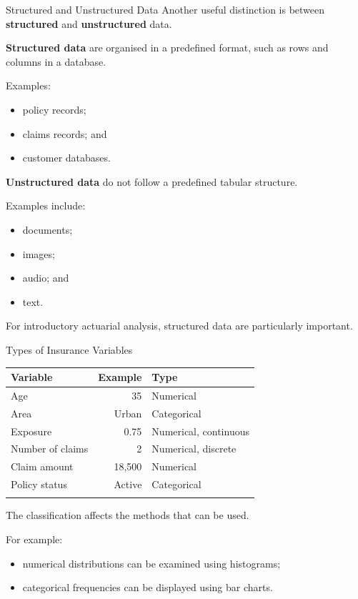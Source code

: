 \documentclass[
  ignorenonframetext,
  aspectratio=169,
]{beamer}
\newcounter{none} %
\providecommand{\tightlist}{%
  \setlength{\itemsep}{0pt}\setlength{\parskip}{0pt}}
\begin{document}
\begin{frame}{Structured and Unstructured Data}
\protect{}\label{structured-and-unstructured-data}
Another useful distinction is between \textbf{structured} and
\textbf{unstructured} data.

\textbf{Structured data} are organised in a predefined format, such as
rows and columns in a database.

Examples:

\begin{itemize}
\tightlist
\item
  policy records;
\item
  claims records; and
\item
  customer databases.
\end{itemize}

\textbf{Unstructured data} do not follow a predefined tabular structure.

Examples include:

\begin{itemize}
\tightlist
\item
  documents;
\item
  images;
\item
  audio; and
\item
  text.
\end{itemize}

For introductory actuarial analysis, structured data are particularly
important.
\end{frame}

\begin{frame}{Types of Insurance Variables}
\protect{}\label{types-of-insurance-variables}
{\def\LTcaptype{none} %
\begin{longtable}[]{@{}lrl@{}}
\toprule\noalign{}
Variable & Example & Type \\
\midrule\noalign{}
\endhead
Age & 35 & Numerical \\
Area & Urban & Categorical \\
Exposure & 0.75 & Numerical, continuous \\
Number of claims & 2 & Numerical, discrete \\
Claim amount & 18,500 & Numerical \\
Policy status & Active & Categorical \\
\bottomrule\noalign{}
\end{longtable}
}

The classification affects the methods that can be used.

For example:

\begin{itemize}
\tightlist
\item
  numerical distributions can be examined using histograms;
\item
  categorical frequencies can be displayed using bar charts.
\end{itemize}
\end{frame}
\end{document}
